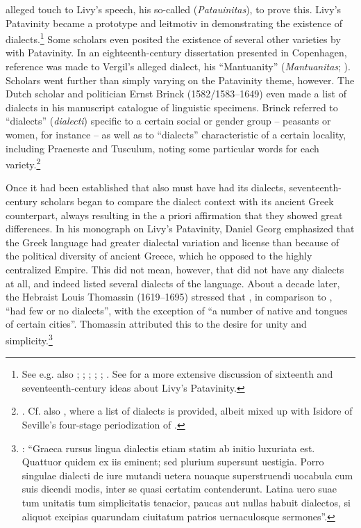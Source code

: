 alleged  touch to Livy’s speech, his so-called  (\textit{Patauinitas}), to prove this. Livy’s Patavinity became a prototype and leitmotiv in demonstrating the existence of  dialects.\footnote{See e.g. also \citet[b.viii\textsc{\textsuperscript{v}}]{Castiglione1528}; \citet[*.iii\textsc{\textsuperscript{r}}]{Estienne1582}; \citet[174, 176]{Schottel1663}; \citet[311]{Rice1765}; \citet[: \textsc{lix}]{Mazzarella-farao1779}; \citet[203--204]{Ries1786}. See \citet{VanRooy2018a} for a more extensive discussion of sixteenth and seventeenth-century ideas about Livy’s Patavinity.} Some scholars even posited the existence of several other  varieties by  with Patavinity. In an eighteenth-century dissertation presented in Copenhagen, reference was made to Vergil’s alleged  dialect, his “Mantuanity” (\textit{Mantuanitas}; \citealt[22]{Munthe1748}). Scholars went further than simply varying on the Patavinity theme, however. The Dutch scholar and politician Ernst Brinck (1582/1583–1649) even made a list of  dialects in his manuscript catalogue of linguistic specimens. Brinck referred to “dialects” (\textit{dialecti}) specific to a certain social or gender group – peasants or women, for instance – as well as to “dialects” characteristic of a certain locality, including Praeneste and Tusculum, noting some particular words for each variety.\footnote{\citet[56\textsc{\textsuperscript{v}}]{Brinck1615}. Cf. also \citet[43]{Stubbe1657}, where a list of  dialects is provided, albeit mixed up with Isidore of Seville’s four-stage periodization of .}

Once it had been established that  also must have had its dialects, seven\-teenth-century scholars began to compare the  dialect context with its ancient Greek counterpart, always resulting in the a priori affirmation that they showed great differences. In his monograph on Livy’s Patavinity, Daniel Georg \citet[146]{Morhof1685} emphasized that the Greek language had greater dialectal variation and license than  because of the political diversity of ancient Greece, which he opposed to the highly centralized  Empire. This did not mean, however, that  did not have any dialects at all, and \citet[148--149]{Morhof1685} indeed listed several dialects of the language. About a decade later, the Hebraist Louis Thomassin (1619–1695) stressed that , in comparison to , “had few or no dialects”, with the exception of “a number of native and  tongues of certain cities”. Thomassin attributed this to the  desire for unity and simplicity.\footnote{\citet[xix]{Thomassin1697}: “Graeca rursus lingua dialectis etiam statim ab initio luxuriata est. Quattuor quidem ex iis eminent; sed plurium supersunt uestigia. Porro singulae dialecti de iure mutandi uetera nouaque superstruendi uocabula cum suis dicendi modis, inter se quasi certatim contenderunt. Latina uero suae tum unitatis tum simplicitatis tenacior, paucas aut nullas habuit dialectos, si aliquot excipias quarundam ciuitatum patrios uernaculosque sermones”.}


